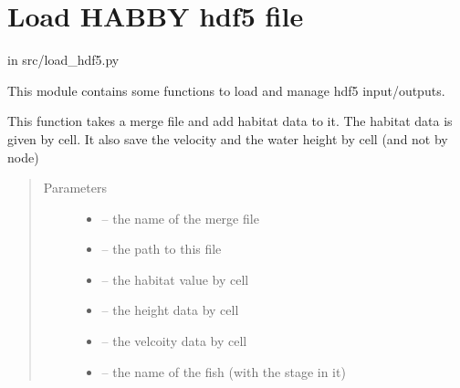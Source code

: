 \documentclass[letterpaper,10pt,english]{sphinxmanual}
\begin{document}
\section{Load HABBY hdf5 file}
\label{\detokenize{index:load-habby-hdf5-file}}
in src/load\_hdf5.py

This module contains some functions to load and manage hdf5 input/outputs.
\label{\detokenize{index:module-src.load_hdf5}}

\begin{fulllineitems}
\label{\detokenize{index:src.load_hdf5.add_habitat_to_merge}}
This function takes a merge file and add habitat data to it. The habitat data is given by cell. It also save the
velocity and the water height by cell (and not by node)
\begin{quote}\begin{description}
\item[{Parameters}] \leavevmode\begin{itemize}
\item {} 
 -- the name of the merge file

\item {} 
 -- the path to this file

\item {} 
 -- the habitat value by cell

\item {} 
 -- the height data by cell

\item {} 
 -- the velcoity data by cell

\item {} 
 -- the name of the fish (with the stage in it)

\end{itemize}

\end{description}\end{quote}

\end{fulllineitems}
\end{document}
